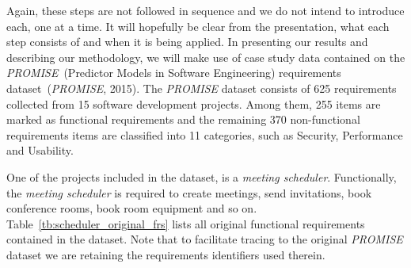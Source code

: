 \documentclass[dissertation,final]{softeng}
\begin{document}
Again, these steps are not followed in sequence and we do not intend to introduce each, one at a time. It will hopefully be clear from the presentation, what each step consists of and when it is being applied. 
In presenting our results and describing our methodology, we will make use of case study data contained on the \emph{PROMISE}~(Predictor Models in Software Engineering) requirements dataset~(\emph{PROMISE}, 2015). The \emph{PROMISE} dataset consists of 625 requirements collected from 15 software development projects. Among them, 255 items are marked as functional requirements and the remaining 370 non-functional requirements items are classified into 11 categories, such as Security, Performance and Usability.

One of the projects included in the dataset, is a \emph{meeting scheduler}. Functionally, the \emph{meeting scheduler} is required to create meetings, send invitations, book conference rooms, book room equipment and so on. Table~\ref{tb:scheduler_original_frs} lists all original functional requirements  contained in the dataset. Note that to facilitate tracing to the original \emph{PROMISE} dataset we are retaining the requirements identifiers used therein.
\end{document}
